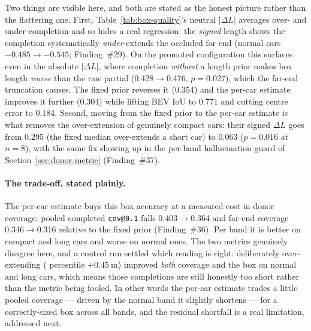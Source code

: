 Two things are visible here, and both are stated as the honest picture rather
than the flattering one. First, Table~\ref{tab:box-quality}'s neutral
$|\Delta L|$ averages over- and under-completion and so hides a real regression:
the \emph{signed} length shows the completion systematically \emph{under}-extends
the occluded far end (normal cars $-0.485\to-0.545$; Finding~\#29). On the
promoted configuration this surfaces even in the absolute $|\Delta L|$, where
completion \emph{without} a length prior makes box length \emph{worse} than the
raw partial (\num{0.428}$\to$\num{0.476}, $p=0.027$), which the far-end truncation
causes. The fixed prior
reverses it (\num{0.354}) and the per-car estimate improves it further
(\num{0.304}) while lifting BEV IoU to \num{0.771} and cutting centre error to
\num{0.184}. Second, moving from the fixed prior to the per-car estimate is what
removes the over-extension of genuinely compact cars: their signed $\Delta L$ goes
from \num{+0.295} (the fixed median over-extends a short car) to \num{+0.063}
($p=0.016$ at $n=8$), with the same fix showing up in the per-band hallucination
guard of Section~\ref{sec:donor-metric} (Finding~\#37).

\paragraph{The trade-off, stated plainly.} The per-car estimate buys this box
accuracy at a measured cost in donor coverage: pooled completed \texttt{cov@0.1}
falls \num{0.403}$\to$\num{0.364} and far-end coverage \num{0.346}$\to$\num{0.316}
relative to the fixed prior (Finding~\#36). Per band it is better on compact and
long cars and worse on normal ones. The two metrics genuinely disagree here, and
a control run settled which reading is right: deliberately over-extending
( percentile $+\SI{0.45}{\meter}$) improved \emph{both} coverage and the
box on normal and long cars, which means those completions are still honestly too
short rather than the metric being fooled. In other words the per-car estimate
trades a little pooled coverage --- driven by the normal band it slightly
shortens --- for a correctly-sized box across all bands, and the residual
shortfall is a real limitation, addressed next.

